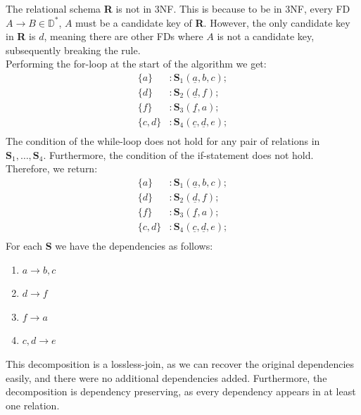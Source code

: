 \documentclass[letterpaper]{article}
\theoremstyle{plain}
\theoremstyle{definition}
\theoremstyle{remark}
\begin{document}
\subsubsection{}
The relational schema \textbf{R} is not in 3NF. This is because to be in 3NF, every FD $A\to B\in\mathbb{D}^*$, $A$ must be a candidate key of \textbf{R}. However, the only candidate key in \textbf{R} is $d$, meaning there are other FDs where $A$ is not a candidate key, subsequently breaking the rule.\\[1em]
Performing the for-loop at the start of the algorithm we get:
\begin{align*}
    \{a\}&: \textbf{S}_1(\underline{a},b,c);\\
    \{d\}&: \textbf{S}_2(\underline{d},f);\\
    \{f\}&: \textbf{S}_3(\underline{f},a);\\
    \{c,d\}&: \textbf{S}_4(\underline{c},\underline{d},e);\\
\end{align*}
The condition of the while-loop does not hold for any pair of relations in $\textbf{S}_1,\ldots,\textbf{S}_4$. Furthermore, the condition of the if-statement does not hold. Therefore, we return: 
\begin{align*}
    \{a\}&: \textbf{S}_1(\underline{a},b,c);\\
    \{d\}&: \textbf{S}_2(\underline{d},f);\\
    \{f\}&: \textbf{S}_3(\underline{f},a);\\
    \{c,d\}&: \textbf{S}_4(\underline{c},\underline{d},e);\\
\end{align*}
\newpage
\noindent For each \textbf{S} we have the dependencies as follows:
\begin{enumerate}[label=$\textbf{S}_\text{\arabic*}$]
    \item $a\to b,c$
    \item $d\to f$
    \item $f\to a$
    \item $c,d\to e$
\end{enumerate}
This decomposition is a lossless-join, as we can recover the original dependencies easily, and there were no additional dependencies added. Furthermore, the decomposition is dependency preserving, as every dependency appears in at least one relation.
\end{document}
